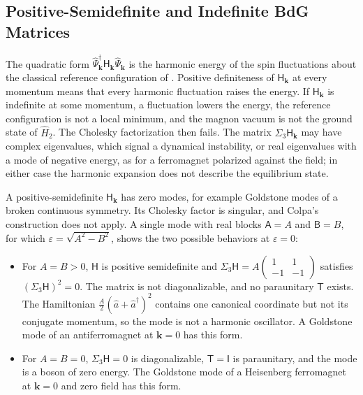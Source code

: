 \subsection{Positive-Semidefinite and Indefinite BdG Matrices}

The quadratic form \(\hat\Psi_{\mathbf k}^\dagger\mathsf H_{\mathbf k}\hat\Psi_{\mathbf k}\) is the harmonic energy of the spin fluctuations about the classical reference configuration of . Positive definiteness of \(\mathsf H_{\mathbf k}\) at every momentum means that every harmonic fluctuation raises the energy. If \(\mathsf H_{\mathbf k}\) is indefinite at some momentum, a fluctuation lowers the energy, the reference configuration is not a local minimum, and the magnon vacuum is not the ground state of \(\hat H_2\). The Cholesky factorization then fails. The matrix \(\Sigma_3\mathsf H_{\mathbf k}\) may have complex eigenvalues, which signal a dynamical instability, or real eigenvalues with a mode of negative energy, as for a ferromagnet polarized against the field; in either case the harmonic expansion does not describe the equilibrium state.

A positive-semidefinite \(\mathsf H_{\mathbf k}\) has zero modes, for example Goldstone modes of a broken continuous symmetry. Its Cholesky factor is singular, and Colpa's construction does not apply. A single mode with real blocks \(\mathsf A=A\) and \(\mathsf B=B\), for which \(\varepsilon=\sqrt{A^2-B^2}\), shows the two possible behaviors at \(\varepsilon=0\):

\begin{itemize}
\tightlist
\item
  For \(A=B>0\), \(\mathsf H\) is positive semidefinite and \(\Sigma_3\mathsf H=A\begin{pmatrix}1&1\\-1&-1\end{pmatrix}\) satisfies \((\Sigma_3\mathsf H)^2=0\). The matrix is not diagonalizable, and no paraunitary \(\mathsf T\) exists. The Hamiltonian \(\frac A2(\hat a+\hat a^\dagger)^2\) contains one canonical coordinate but not its conjugate momentum, so the mode is not a harmonic oscillator. A Goldstone mode of an antiferromagnet at \(\mathbf k=0\) has this form.
\item
  For \(A=B=0\), \(\Sigma_3\mathsf H=0\) is diagonalizable, \(\mathsf T=\mathsf I\) is paraunitary, and the mode is a boson of zero energy. The Goldstone mode of a Heisenberg ferromagnet at \(\mathbf k=0\) and zero field has this form.
\end{itemize}

